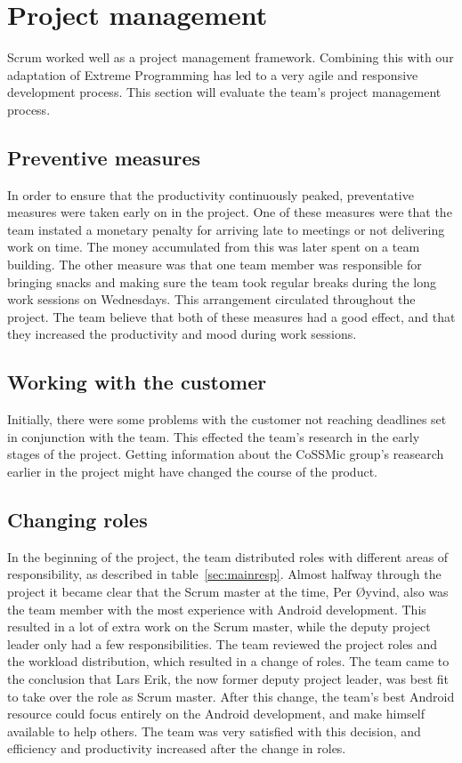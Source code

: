 \section{Project management}
Scrum worked well as a project management framework. Combining this with our adaptation of Extreme Programming has led to a very agile and responsive development process. This section will evaluate the team's project management process.

\subsection{Preventive measures}
In order to ensure that the productivity continuously peaked, preventative measures were taken early on in the project. One of these measures were that the team instated a monetary penalty for arriving late to meetings or not delivering work on time. The money accumulated from this was later spent on a team building. The other measure was that one team member was responsible for bringing snacks and making sure the team took regular breaks during the long work sessions on Wednesdays. This arrangement circulated throughout the project. The team believe that both of these measures had a good effect, and that they increased the productivity and mood during work sessions.

\subsection{Working with the customer}
 Initially, there were some problems with the customer not reaching deadlines set in conjunction with the team. This effected the team's research in the early stages of the project. Getting information about the CoSSMic group's reasearch earlier in the project might have changed the course of the product. 

\subsection{Changing roles}
\label{sec:unbalancedWorkload}
In the beginning of the project, the team distributed roles with different areas of responsibility, as described in table~\ref{sec:mainresp}. Almost halfway through the project it became clear that the Scrum master at the time, Per Øyvind, also was the team member with the most experience with Android development. This resulted in a lot of extra work on the Scrum master, while the deputy project leader only had a few responsibilities. The team reviewed the project roles and the workload distribution, which resulted in a change of roles. The team came to the conclusion that Lars Erik, the now former deputy project leader, was best fit to take over the role as Scrum master. After this change, the team's best Android resource could focus entirely on the Android development, and make himself available to help others. The team was very satisfied with this decision, and efficiency and productivity increased after the change in roles.

